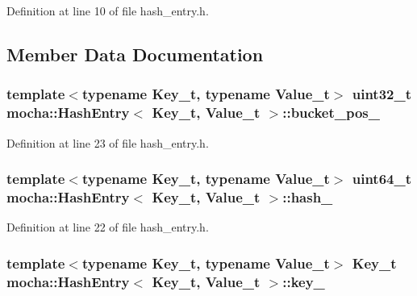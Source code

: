 Definition at line 10 of file hash\_\-entry.h.



\subsection{Member Data Documentation}
\hypertarget{classmocha_1_1_hash_entry_aaab82e5749291b8bda08fcdcca08e11c}{
\subsubsection[{bucket\_\-pos\_\-}]{\setlength{\rightskip}{0pt plus 5cm}template$<$typename Key\_\-t, typename Value\_\-t$>$ uint32\_\-t {\bf mocha::HashEntry}$<$ Key\_\-t, Value\_\-t $>$::{\bf bucket\_\-pos\_\-}}}
\label{classmocha_1_1_hash_entry_aaab82e5749291b8bda08fcdcca08e11c}


Definition at line 23 of file hash\_\-entry.h.

\hypertarget{classmocha_1_1_hash_entry_a0d1b2dc5badc8eb2695c7cebbab6f9a5}{
\subsubsection[{hash\_\-}]{\setlength{\rightskip}{0pt plus 5cm}template$<$typename Key\_\-t, typename Value\_\-t$>$ uint64\_\-t {\bf mocha::HashEntry}$<$ Key\_\-t, Value\_\-t $>$::{\bf hash\_\-}}}
\label{classmocha_1_1_hash_entry_a0d1b2dc5badc8eb2695c7cebbab6f9a5}


Definition at line 22 of file hash\_\-entry.h.

\hypertarget{classmocha_1_1_hash_entry_a08cc73b09fbd834a37811cb0edb40624}{
\subsubsection[{key\_\-}]{\setlength{\rightskip}{0pt plus 5cm}template$<$typename Key\_\-t, typename Value\_\-t$>$ Key\_\-t {\bf mocha::HashEntry}$<$ Key\_\-t, Value\_\-t $>$::{\bf key\_\-}}}
\label{classmocha_1_1_hash_entry_a08cc73b09fbd834a37811cb0edb40624}


